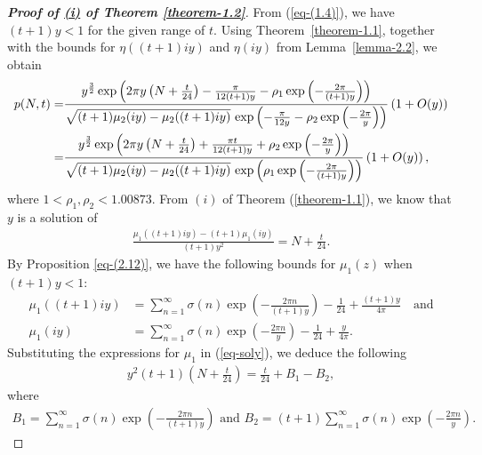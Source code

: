 \documentclass[11pt]{amsart}
\theoremstyle{plain}
\numberwithin{equation}{section}
\begin{document}
		\begin{proof}[\textbf{\boldmath Proof of \hyperlink{thm1.2i}{{(i)}} of Theorem \ref{theorem-1.2}}]
			From (\ref{eq-(1.4)}), we have $(t+1)y < 1$ for the given range of $t$. Using Theorem~\ref{theorem-1.1}, together with the bounds for $\eta((t+1)iy)$ and $\eta(iy)$ from Lemma~\ref{lemma-2.2}, we obtain
			\begin{align}\label{eq-pNT}
				\notag
				p(N,t)=&\frac{y^{\frac{3}{2}}\exp\left(2\pi y\left(N+\frac{t}{24}\right)-\frac{\pi}{12(t+1)y}-\rho_{1}\exp\left(-\frac{2\pi}{(t+1)y}\right)\right)}{\sqrt{(t+1)\mu_{2}(iy)-\mu_{2}((t+1)iy)}\,\exp\left(-\frac{\pi}{12y}-\rho_{2}\exp\left(-\frac{2\pi}{y}\right)\right)}\left(1+O(y)\right)\\
				=&\frac{y^{\frac{3}{2}}\exp\left(2\pi y\left(N+\frac{t}{24}\right)+\frac{\pi t}{12(t+1)y}+\rho_{2}\exp\left(-\frac{2\pi}{y}\right)\right)}{\sqrt{(t+1)\mu_{2}(iy)-\mu_{2}((t+1)iy)}\,\exp\left(\rho_1\exp\left(-\frac{2\pi}{(t+1)y}\right)\right)}\left(1+O(y)\right),
			\end{align}
			where $1 < \rho_1, \rho_2 < 1.00873$.
			\newline
			From $(i)$ of Theorem (\ref{theorem-1.1}), we know that $y$ is a solution of 
			\begin{align}\label{eq-soly}
				\frac{\mu_{1}((t+1)iy) - (t+1)\mu_{1}(iy)}{(t+1)y^{2}} = N + \frac{t}{24}. 
			\end{align}
			By Proposition \ref{eq-(2.12)}, we have the following bounds for $\mu_1(z)$ when $(t+1)y<1$:
			\begin{align*}
				\mu_{1}((t+1)iy)&=\sum_{n=1}^{\infty}\sigma(n)\exp\left(-\frac{2\pi n}{(t+1)y}\right) -\frac{1}{24}+\frac{(t+1)y}{4\pi}\quad\text{and} \\
				\mu_{1}(iy)&=\sum_{n=1}^{\infty}\sigma(n)\exp\left(-\frac{2\pi n}{y}\right) -\frac{1}{24}+\frac{y}{4\pi}.   
			\end{align*}
			Substituting the expressions for $\mu_1$ in (\ref{eq-soly}), we deduce the following
			\begin{align}\label{eq-AB}
				y^{2}(t+1)\left(N+\frac{t}{24}\right)=\frac{t}{24}+ B_1-B _2, 
			\end{align}
			where
			\begin{align*}
				B_1=\sum_{n=1}^{\infty}\sigma(n)\exp\left(-\frac{2\pi n}{(t+1)y}\right)\,\,\text{and  } B_2=(t+1) \sum_{n=1}^{\infty}\sigma(n)\exp\left(-\frac{2\pi n}{y}\right).  

\end{align*}
\end{proof}
\end{document}
